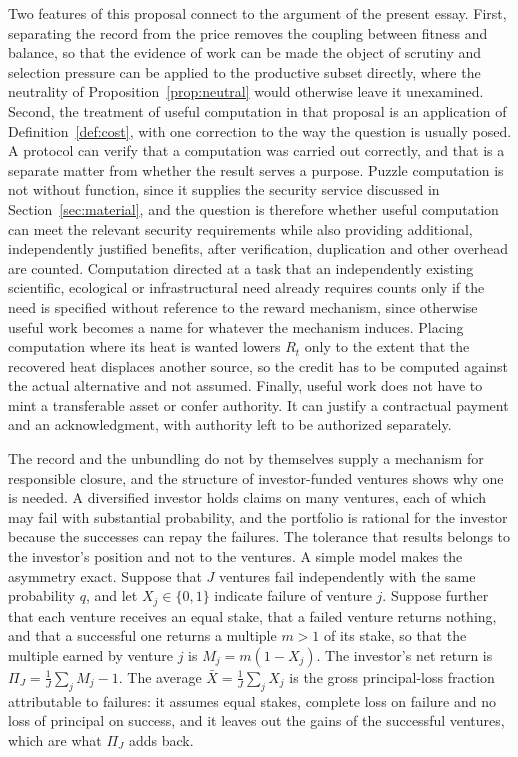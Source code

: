 \documentclass[11pt]{article}
\theoremstyle{remark}
\begin{document}
Two features of this proposal connect to the argument of the present essay. First, separating the record from the price removes the coupling between fitness and balance, so that the evidence of work can be made the object of scrutiny and selection pressure can be applied to the productive subset directly, where the neutrality of Proposition~\ref{prop:neutral} would otherwise leave it unexamined. Second, the treatment of useful computation in that proposal is an application of Definition~\ref{def:cost}, with one correction to the way the question is usually posed. A protocol can verify that a computation was carried out correctly, and that is a separate matter from whether the result serves a purpose. Puzzle computation is not without function, since it supplies the security service discussed in Section~\ref{sec:material}, and the question is therefore whether useful computation can meet the relevant security requirements while also providing additional, independently justified benefits, after verification, duplication and other overhead are counted. Computation directed at a task that an independently existing scientific, ecological or infrastructural need already requires counts only if the need is specified without reference to the reward mechanism, since otherwise useful work becomes a name for whatever the mechanism induces. Placing computation where its heat is wanted lowers $R_t$ only to the extent that the recovered heat displaces another source, so the credit has to be computed against the actual alternative and not assumed. Finally, useful work does not have to mint a transferable asset or confer authority. It can justify a contractual payment and an acknowledgment, with authority left to be authorized separately.

The record and the unbundling do not by themselves supply a mechanism for responsible closure, and the structure of investor-funded ventures shows why one is needed. A diversified investor holds claims on many ventures, each of which may fail with substantial probability, and the portfolio is rational for the investor because the successes can repay the failures. The tolerance that results belongs to the investor's position and not to the ventures. A simple model makes the asymmetry exact. Suppose that $J$ ventures fail independently with the same probability $q$, and let $X_j\in\{0,1\}$ indicate failure of venture $j$. Suppose further that each venture receives an equal stake, that a failed venture returns nothing, and that a successful one returns a multiple $m>1$ of its stake, so that the multiple earned by venture $j$ is $M_j=m(1-X_j)$. The investor's net return is $\Pi_J=\tfrac1J\sum_j M_j-1$. The average $\bar X=\tfrac1J\sum_j X_j$ is the gross principal-loss fraction attributable to failures: it assumes equal stakes, complete loss on failure and no loss of principal on success, and it leaves out the gains of the successful ventures, which are what $\Pi_J$ adds back.
\end{document}
